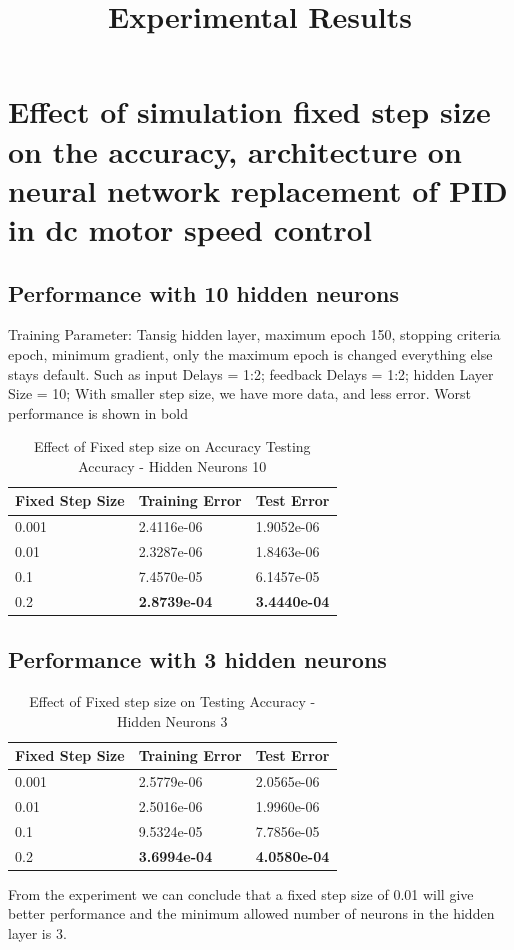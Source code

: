 \documentclass{article}
\title{Experimental Results}
\begin{document}
   \maketitle

\section{Effect of simulation fixed step size on the accuracy, architecture  on neural network replacement of PID in dc motor speed control \label{step_size}}
\subsection{Performance with 10 hidden neurons}
Training Parameter: Tansig hidden layer, maximum epoch 150, stopping criteria epoch, minimum gradient, only the maximum epoch is changed everything else stays default. Such as input Delays = 1:2;
feedback Delays = 1:2; hidden Layer Size = 10; 
With smaller step size, we have more data, and less error. Worst performance is shown in bold
\begin{table}[H]
\centering
\caption{\label{tab1}Effect of Fixed step size on Accuracy Testing Accuracy - Hidden Neurons 10}
\begin{tabular}{|l|l|l|}
\hline
Fixed Step Size & Training Error & Test Error \\ \hline
0.001           & 2.4116e-06     & 1.9052e-06 \\ \hline
0.01            & 2.3287e-06     & 1.8463e-06 \\ \hline
0.1             & 7.4570e-05     & 6.1457e-05 \\ \hline
0.2             & \textbf{2.8739e-04}     & \textbf{3.4440e-04} \\ \hline
\end{tabular}
\end{table}
\subsection{Performance with 3 hidden neurons}
\begin{table}[H]
\centering
\caption{\label{tab2}Effect of Fixed step size on Testing Accuracy - Hidden Neurons 3}
\begin{tabular}{|l|l|l|}
\hline
Fixed Step Size & Training Error & Test Error \\ \hline
0.001           & 2.5779e-06     & 2.0565e-06 \\ \hline
0.01            & 2.5016e-06     & 1.9960e-06 \\ \hline
0.1             & 9.5324e-05     & 7.7856e-05 \\ \hline
0.2             & \textbf{3.6994e-04 }     & \textbf{4.0580e-04} \\ \hline
\end{tabular}
\end{table}
From the experiment we can conclude that a fixed step size of 0.01 will give better performance and the minimum allowed number of neurons in the hidden layer is 3.
\end{document}
